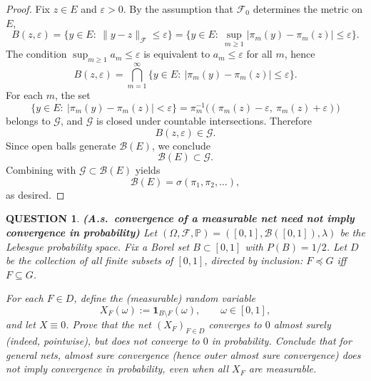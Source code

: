 \documentclass[12pt]{article}
\renewcommand{\(}{\left(}%
\renewcommand{\)}{\right)}%
\renewcommand{\[}{\left[}%
\renewcommand{\]}{\right]}%
\newcommand{\p}{\mathbb{P}}
\newtheorem{question}{QUESTION}[section]}
\newtheorem{proof}{Proof.}}
\begin{document}
\begin{proof}
Fix $z\in E$ and $\varepsilon>0$. By the assumption that $\mathcal F_0$ determines the metric on $E$,
\begin{equation*}
B(z,\varepsilon)
=
\{y\in E:\ \|y-z\|_{\mathcal F}\leq\varepsilon\}
=
\Big\{y\in E:\ \sup_{m\ge 1}|\pi_m(y)-\pi_m(z)|\leq\varepsilon\Big\}.
\end{equation*}
The condition $\sup_{m\ge 1} a_m\leq\varepsilon$ is equivalent to $a_m\leq\varepsilon$ for all $m$, hence
\begin{equation*}
B(z,\varepsilon)
=
\bigcap_{m=1}^\infty
\Big\{y\in E:\ |\pi_m(y)-\pi_m(z)|\leq\varepsilon\Big\}.
\end{equation*}
For each $m$, the set
\begin{equation*}
\Big\{y\in E:\ |\pi_m(y)-\pi_m(z)|<\varepsilon\Big\}
=
\pi_m^{-1}\big((\pi_m(z)-\varepsilon,\ \pi_m(z)+\varepsilon)\big)
\end{equation*}
belongs to $\mathcal G$, and $\mathcal G$ is closed under countable intersections. Therefore
\begin{equation*}
B(z,\varepsilon)\in \mathcal G.
\end{equation*}
Since open balls generate $\mathcal B(E)$, we conclude
\begin{equation*}
\mathcal B(E)\subset \mathcal G.
\end{equation*}
Combining with $\mathcal G\subset\mathcal B(E)$ yields
\begin{equation*}
\mathcal B(E)=\sigma(\pi_1,\pi_2,\dots),
\end{equation*}
as desired.
\end{proof}

\begin{question}{\emph{\bfseries (A.s.\ convergence of a measurable net need not imply convergence in probability)}}
Let $(\Omega,\mathcal F,\p)=([0,1],\mathcal B([0,1]),\lambda)$ be the Lebesgue probability space.
Fix a Borel set $B\subset[0,1]$ with $P(B)=1/2$. Let $D$ be the collection of all finite subsets
of $[0,1]$, directed by inclusion: $F\preceq G$ iff $F\subseteq G$.

For each $F\in D$, define the (measurable) random variable
\begin{equation*}
X_F(\omega):=\mathbf 1_{B\setminus F}(\omega),\qquad \omega\in[0,1],
\end{equation*}
and let $X\equiv 0$. Prove that the net $(X_F)_{F\in D}$ converges to $0$ almost surely (indeed,
pointwise), but does \emph{not} converge to $0$ in probability. Conclude that for general nets,
almost sure convergence (hence outer almost sure convergence) does not imply convergence in
probability, even when all $X_F$ are measurable.
\end{question}
\end{document}
